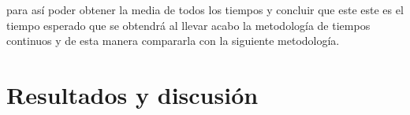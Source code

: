         para así poder obtener la media de todos los tiempos y concluir que este este es el tiempo esperado que se obtendrá al llevar acabo la metodología de tiempos continuos y de esta manera compararla con la siguiente metodología.
     
    
    
    

    
    
    
    \section{Resultados y discusión}
    
